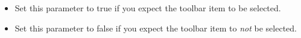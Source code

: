 
\begin{itemize}
\item Set this parameter to true if you expect the toolbar item to be  selected.
\item Set this parameter to false if you expect the toolbar item to \emph{not} be selected.
\end{itemize}

